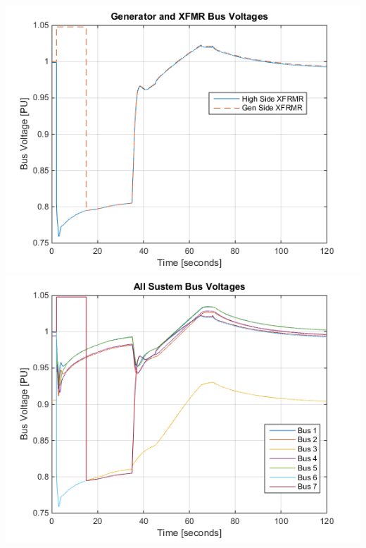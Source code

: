 \documentclass[12pt]{article}
\begin{document}
\begin{center}
\includegraphics[width=.49\linewidth]{genBusV} %
\includegraphics[width=.49\linewidth]{sysBusV} 
\end{center}
\end{document}
